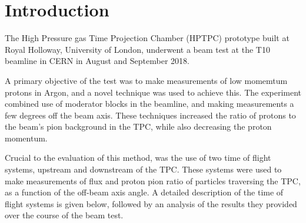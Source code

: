 \section{Introduction}

The High Pressure gas Time Projection Chamber (HPTPC) prototype built at Royal Holloway, University of London, underwent a beam test at the T10 beamline in CERN in August and September 2018.

A primary objective of the test was to make measurements of low momemtum protons in Argon, and a novel technique was used to achieve this.
The experiment combined use of moderator blocks in the beamline, and making measurements a few degrees off the beam axis.
These techniques increased the ratio of protons to the beam's pion background in the TPC, while also decreasing the proton momentum.

Crucial to the evaluation of this method, was the use of two time of flight systems, upstream and downstream of the TPC.
These systems were used to make measurements of flux and proton pion ratio of particles traversing the TPC, as a function of the off-beam axis angle.
A detailed description of the time of flight systems is given below, followed by an analysis of the results they provided over the course of the beam test.